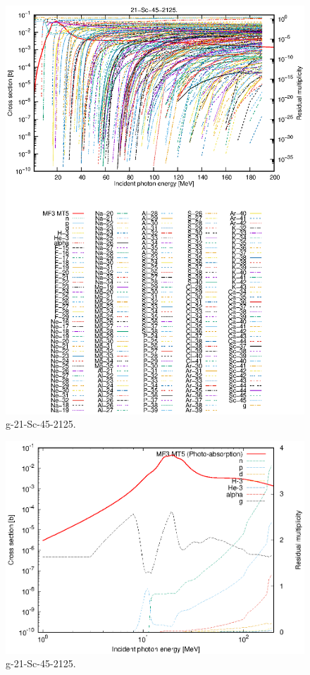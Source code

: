 \begin{figure}
 \includegraphics[width=\linewidth]{eps/g_21-Sc-45_2125.eps}
  \caption{g-21-Sc-45-2125.}
\end{figure}
\newpage \clearpage

\begin{figure}
 \includegraphics[width=\linewidth]{eps-log/g_21-Sc-45_2125.eps}
 \caption{g-21-Sc-45-2125.}
\end{figure}
\newpage \clearpage


